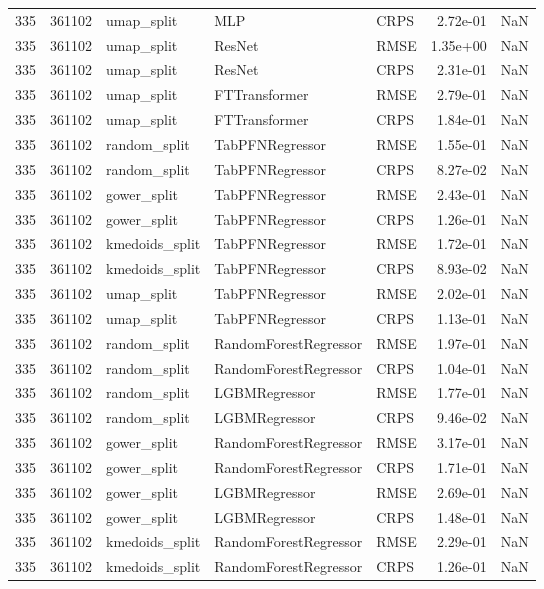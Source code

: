 \begin{tabular}{rrlllrr}
335 & 361102 & umap\_split & MLP & CRPS & 2.72e-01 & NaN \\
335 & 361102 & umap\_split & ResNet & RMSE & 1.35e+00 & NaN \\
335 & 361102 & umap\_split & ResNet & CRPS & 2.31e-01 & NaN \\
335 & 361102 & umap\_split & FTTransformer & RMSE & 2.79e-01 & NaN \\
335 & 361102 & umap\_split & FTTransformer & CRPS & 1.84e-01 & NaN \\
335 & 361102 & random\_split & TabPFNRegressor & RMSE & 1.55e-01 & NaN \\
335 & 361102 & random\_split & TabPFNRegressor & CRPS & 8.27e-02 & NaN \\
335 & 361102 & gower\_split & TabPFNRegressor & RMSE & 2.43e-01 & NaN \\
335 & 361102 & gower\_split & TabPFNRegressor & CRPS & 1.26e-01 & NaN \\
335 & 361102 & kmedoids\_split & TabPFNRegressor & RMSE & 1.72e-01 & NaN \\
335 & 361102 & kmedoids\_split & TabPFNRegressor & CRPS & 8.93e-02 & NaN \\
335 & 361102 & umap\_split & TabPFNRegressor & RMSE & 2.02e-01 & NaN \\
335 & 361102 & umap\_split & TabPFNRegressor & CRPS & 1.13e-01 & NaN \\
335 & 361102 & random\_split & RandomForestRegressor & RMSE & 1.97e-01 & NaN \\
335 & 361102 & random\_split & RandomForestRegressor & CRPS & 1.04e-01 & NaN \\
335 & 361102 & random\_split & LGBMRegressor & RMSE & 1.77e-01 & NaN \\
335 & 361102 & random\_split & LGBMRegressor & CRPS & 9.46e-02 & NaN \\
335 & 361102 & gower\_split & RandomForestRegressor & RMSE & 3.17e-01 & NaN \\
335 & 361102 & gower\_split & RandomForestRegressor & CRPS & 1.71e-01 & NaN \\
335 & 361102 & gower\_split & LGBMRegressor & RMSE & 2.69e-01 & NaN \\
335 & 361102 & gower\_split & LGBMRegressor & CRPS & 1.48e-01 & NaN \\
335 & 361102 & kmedoids\_split & RandomForestRegressor & RMSE & 2.29e-01 & NaN \\
335 & 361102 & kmedoids\_split & RandomForestRegressor & CRPS & 1.26e-01 & NaN \\

\end{tabular}
